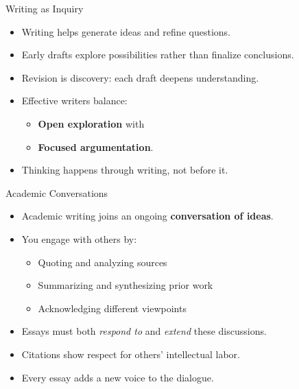 \documentclass[aspectratio=169]{beamer}
\begin{document}
\begin{frame}{Writing as Inquiry}
\begin{itemize}
  \item Writing helps generate ideas and refine questions.
  \item Early drafts explore possibilities rather than finalize conclusions.
  \item Revision is discovery: each draft deepens understanding.
  \item Effective writers balance:
    \begin{itemize}
      \item \textbf{Open exploration} with
      \item \textbf{Focused argumentation}.
    \end{itemize}
  \item Thinking happens through writing, not before it.
\end{itemize}
\end{frame}

\begin{frame}{Academic Conversations}
\begin{itemize}
  \item Academic writing joins an ongoing \textbf{conversation of ideas}.
  \item You engage with others by:
    \begin{itemize}
      \item Quoting and analyzing sources
      \item Summarizing and synthesizing prior work
      \item Acknowledging different viewpoints
    \end{itemize}
  \item Essays must both \emph{respond to} and \emph{extend} these discussions.
  \item Citations show respect for others’ intellectual labor.
  \item Every essay adds a new voice to the dialogue.
\end{itemize}
\end{frame}



\end{document}
